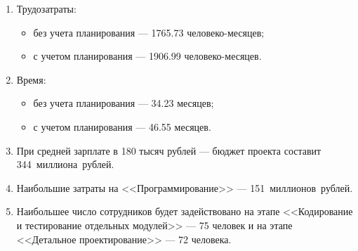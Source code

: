 \begin{enumerate}
    \item Трудозатраты:
        \begin{itemize}
            \item без учета планирования --- 1765.73 человеко-месяцев;
            \item с учетом планирования --- 1906.99 человеко-месяцев.
        \end{itemize}
    \item Время:
        \begin{itemize}
            \item без учета планирования --- 34.23 месяцев;
            \item с учетом планирования --- 46.55 месяцев.
        \end{itemize}
    \item При средней зарплате в 180 тысяч рублей --- бюджет проекта составит
        344~миллиона~рублей.
    \item Наибольшие затраты на <<Программирование>> --- 151~миллионов~рублей.
    \item Наибольшее число сотрудников будет задействовано на этапе
        <<Кодирование и тестирование отдельных модулей>> --- 75 человек и на
        этапе <<Детальное проектирование>> --- 72 человека.
\end{enumerate}
